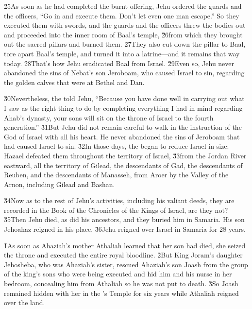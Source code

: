 \v{25}As soon as he had completed the burnt offering, Jehu ordered the guards and the officers, ``Go in and execute them. Don't let even one man escape.'' So they executed them with swords, and the guards and the officers threw the bodies out and proceeded into the inner room of Baal's temple, \v{26}from which they brought out the sacred pillars and burned them. \v{27}They also cut down the pillar to Baal, tore apart Baal's temple, and turned it into a latrine---and it remains that way today. \v{28}That's how Jehu eradicated Baal from Israel. \v{29}Even so, Jehu never abandoned the sins of Nebat's son Jeroboam, who caused Israel to sin, regarding the golden calves that were at Bethel and Dan.

\v{30}Nevertheless, the  told Jehu, ``Because you have done well in carrying out what I saw as the right thing to do by completing everything I had in mind regarding Ahab's dynasty, your sons will sit on the throne of Israel to the fourth generation.'' \v{31}But Jehu did not remain careful to walk in the instruction of the  God of Israel with all his heart. He never abandoned the sins of Jeroboam that had caused Israel to sin. \v{32}In those days, the  began to reduce Israel in size: Hazael defeated them throughout the territory of Israel, \v{33}from the Jordan River eastward, all the territory of Gilead, the descendants of Gad, the descendants of Reuben, and the descendants of Manasseh, from Aroer by the Valley of the Arnon, including Gilead and Bashan.

\v{34}Now as to the rest of Jehu's activities, including his valiant deeds, they are recorded in the Book of the Chronicles of the Kings of Israel, are they not? \v{35}Then Jehu died, as did his ancestors, and they buried him in Samaria. His son Jehoahaz reigned in his place. \v{36}Jehu reigned over Israel in Samaria for 28 years.

\v{1}As soon as Ahaziah's mother Athaliah learned that her son had died, she seized the throne and executed the entire royal bloodline. \v{2}But King Joram's daughter Jehosheba, who was Ahaziah's sister, rescued Ahaziah's son Joash from the group of the king's sons who were being executed and hid him and his nurse in her bedroom, concealing him from Athaliah so he was not put to death. \v{3}So Joash remained hidden with her in the 's Temple for six years while Athaliah reigned over the land.

